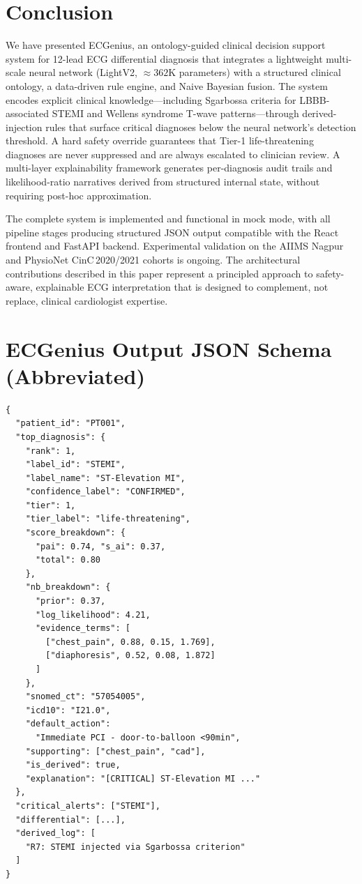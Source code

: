 \documentclass[journal]{IEEEtran}
\begin{document}
\section{Conclusion}
\label{sec:conclusion}

We have presented ECGenius, an ontology-guided clinical decision
support system for 12-lead ECG differential diagnosis that
integrates a lightweight multi-scale neural network
(LightV2, ${\approx}362$K parameters) with a structured clinical
ontology, a data-driven rule engine, and Naive Bayesian fusion.
The system encodes explicit clinical knowledge—including Sgarbossa
criteria for LBBB-associated STEMI and Wellens syndrome T-wave
patterns—through derived-injection rules that surface critical
diagnoses below the neural network's detection threshold.
A hard safety override guarantees that Tier-1 life-threatening
diagnoses are never suppressed and are always escalated to
clinician review.
A multi-layer explainability framework generates per-diagnosis
audit trails and likelihood-ratio narratives derived from
structured internal state, without requiring post-hoc
approximation.

The complete system is implemented and functional in mock mode,
with all pipeline stages producing structured JSON output
compatible with the React frontend and FastAPI backend.
Experimental validation on the AIIMS Nagpur and PhysioNet
CinC\,2020/2021 cohorts is ongoing.
The architectural contributions described in this paper
represent a principled approach to safety-aware, explainable
ECG interpretation that is designed to complement, not replace,
clinical cardiologist expertise.

\appendix
\section{ECGenius Output JSON Schema (Abbreviated)}
\label{app:json}

\begin{small}
\begin{verbatim}
{
  "patient_id": "PT001",
  "top_diagnosis": {
    "rank": 1,
    "label_id": "STEMI",
    "label_name": "ST-Elevation MI",
    "confidence_label": "CONFIRMED",
    "tier": 1,
    "tier_label": "life-threatening",
    "score_breakdown": {
      "pai": 0.74, "s_ai": 0.37,
      "total": 0.80
    },
    "nb_breakdown": {
      "prior": 0.37,
      "log_likelihood": 4.21,
      "evidence_terms": [
        ["chest_pain", 0.88, 0.15, 1.769],
        ["diaphoresis", 0.52, 0.08, 1.872]
      ]
    },
    "snomed_ct": "57054005",
    "icd10": "I21.0",
    "default_action":
      "Immediate PCI - door-to-balloon <90min",
    "supporting": ["chest_pain", "cad"],
    "is_derived": true,
    "explanation": "[CRITICAL] ST-Elevation MI ..."
  },
  "critical_alerts": ["STEMI"],
  "differential": [...],
  "derived_log": [
    "R7: STEMI injected via Sgarbossa criterion"
  ]
}
\end{verbatim}
\end{small}
\end{document}
